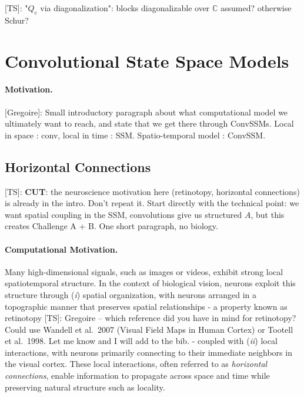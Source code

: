 \documentclass{article}
\newcommand{\greg}[1]{{\color{indigo}[Gregoire]: #1}}
\newcommand{\TS}[1]{{\color{pink}[TS]: #1}}
\begin{document}
\TS{"$Q_c$ via diagonalization": blocks diagonalizable over $\mathbb C$ assumed? otherwise Schur?}

\section{Convolutional State Space Models}

\paragraph{Motivation.} \greg{Small introductory paragraph about what computational model we ultimately want to reach, and state that we get there through ConvSSMs. Local in space : conv, local in time : SSM. Spatio-temporal model : ConvSSM.}

\subsection{Horizontal Connections}
\label{sec:horizontal_connections}

\TS{\textbf{CUT}: the neuroscience motivation here (retinotopy, horizontal connections) is already in the intro. Don't repeat it. Start directly with the technical point: we want spatial coupling in the SSM, convolutions give us structured $A$, but this creates Challenge A + B. One short paragraph, no biology.}

\paragraph{Computational Motivation.} Many high-dimensional signals, such as images or videos, exhibit strong local spatiotemporal structure. In the context of biological vision, neurons exploit this structure through (\emph{i}) spatial organization, with neurons arranged in a topographic manner that preserves spatial relationships - a property known as retinotopy \citep{TODO} \TS{Gregoire -- which reference did you have in mind for retinotopy? Could use Wandell et al.\ 2007 (Visual Field Maps in Human Cortex) or Tootell et al.\ 1998. Let me know and I will add to the bib.} - coupled with (\emph{ii}) local interactions, with neurons primarily connecting to their immediate neighbors in the visual cortex. These local interactions, often referred to as \emph{horizontal connections}, enable information to propagate across space and time while preserving natural structure such as locality.
\end{document}
